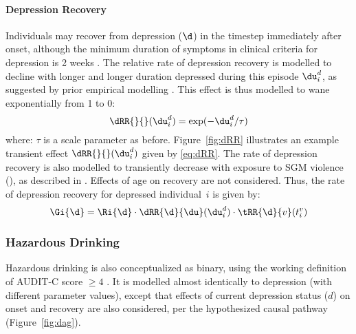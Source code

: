 \paragraph{Depression Recovery}
Individuals may recover from depression ($\d$)
in the timestep immediately after onset,
although the minimum duration of symptoms
in clinical criteria for depression is 2 weeks \cite{APA2013}.
The relative rate of depression recovery is modelled to decline
with longer and longer duration depressed during this episode $\du^d_i$,
as suggested by prior empirical modelling \cite{Patten2005}.
This effect is thus modelled to wane exponentially from 1 to 0:
\begin{equation}\label{eq:dRR}
  \dRR{}{}(\du^d_i) = \exp(-\du^d_i/\tau)
\end{equation}
where: $\tau$ is a scale parameter as before.
Figure~\ref{fig:dRR} illustrates
an example transient effect $\dRR{}{}(\du^d_i)$ given by \eqref{eq:dRR}.
The rate of depression recovery is also modelled to
transiently decrease with exposure to SGM violence (),
as described in .
Effects of age on recovery are not considered.
Thus, the rate of depression recovery for depressed individual~$i$ is given by:
\begin{equation}
  \Gi{\d} = \Ri{\d}
    \cdot \dRR{\d}{\du}(\du^d_i)
    \cdot \tRR{\d}{v}(t^v_i)
\end{equation}
\subsubsection{Hazardous Drinking}\label{mod.par.evt.haz}
Hazardous drinking is also conceptualized as binary,
using the working definition of AUDIT-C score $\ge 4$ \cite{Bush1998}.
It is modelled almost identically to depression
(with different parameter values),
except that effects of current depression status ($d$)
on \hazdrink onset and recovery are also considered,
per the hypothesized causal pathway (Figure~\ref{fig:dag}).
